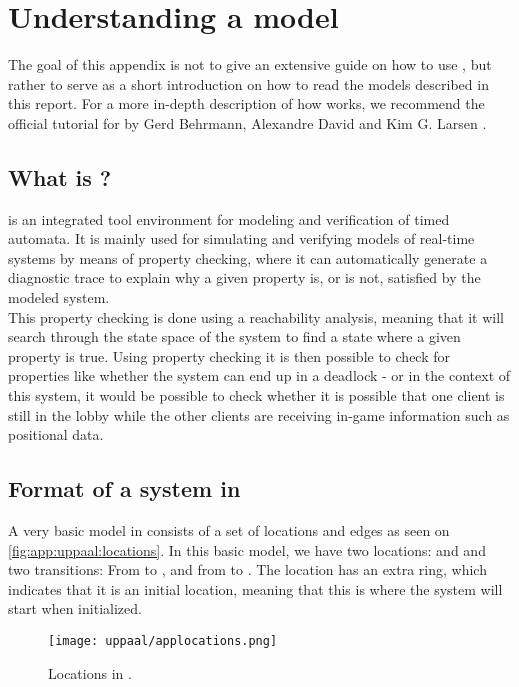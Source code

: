 \section{Understanding a \uppaal model}\label{app:uppaal}

The goal of this appendix is not to give an extensive guide on how to use \uppaal, but rather to serve as a short introduction on how to read the models described in this report.
For a more in-depth description of how \uppaal works, we recommend the official tutorial for  by Gerd Behrmann, Alexandre David and Kim G. Larsen \cite{uppaaltutorial}.

\subsection{What is \uppaal?}
\uppaal is an integrated tool environment for modeling and verification of timed automata.
It is mainly used for simulating and verifying models of real-time systems \cite{uppaalintro} by means of property checking, where it can automatically generate a diagnostic trace to explain why a given property is, or is not, satisfied by the modeled system.\\
This property checking is done using a reachability analysis, meaning that it will search through the state space of the system to find a state where a given property is true.
Using property checking it is then possible to check for properties like whether the system can end up in a deadlock - or in the context of this system, it would be possible to check whether it is possible that one client is still in the lobby while the other clients are receiving in-game information such as positional data.

\subsection{Format of a system in \uppaal}
A very basic model in \uppaal consists of a set of locations and edges as seen on \autoref{fig:app:uppaal:locations}.
In this basic model, we have two locations:  and  and two transitions: From  to , and from  to .
The location  has an extra ring, which indicates that it is an initial location, meaning that this is where the system will start when initialized.

\begin{figure}[H]
    \centering
    \texttt{[image: uppaal/applocations.png]}
    \caption{Locations in \uppaal.}
    \label{fig:app:uppaal:locations}
\end{figure}

